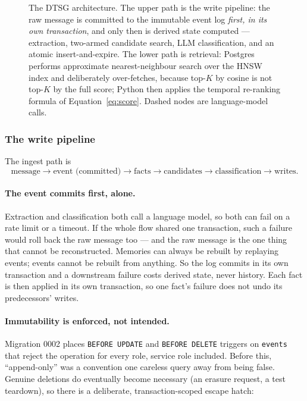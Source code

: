 \documentclass[11pt,a4paper]{article}
\begin{document}
\begin{figure}[htbp]
{}
\caption{The DTSG architecture. The upper path is the write pipeline: the raw
message is committed to the immutable event log \emph{first, in its own
transaction}, and only then is derived state computed --- extraction,
two-armed candidate search, LLM classification, and an atomic
insert-and-expire. The lower path is retrieval: Postgres performs approximate
nearest-neighbour search over the HNSW index and deliberately over-fetches,
because top-$K$ by cosine is not top-$K$ by the full score; Python then applies
the temporal re-ranking formula of Equation~\eqref{eq:score}. Dashed nodes are
language-model calls.}
\label{fig:arch}
\end{figure}

\subsubsection{The write pipeline}

The ingest path is
\[
\text{message} \rightarrow \text{event (committed)} \rightarrow \text{facts}
\rightarrow \text{candidates} \rightarrow \text{classification}
\rightarrow \text{writes}.
\]

\paragraph{The event commits first, alone.} Extraction and classification both
call a language model, so both can fail on a rate limit or a timeout. If the
whole flow shared one transaction, such a failure would roll back the raw
message too --- and the raw message is the one thing that cannot be
reconstructed. Memories can always be rebuilt by replaying events; events
cannot be rebuilt from anything. So the log commits in its own transaction and
a downstream failure costs derived state, never history. Each fact is then
applied in its own transaction, so one fact's failure does not undo its
predecessors' writes.

\paragraph{Immutability is enforced, not intended.} Migration 0002 places
\texttt{BEFORE UPDATE} and \texttt{BEFORE DELETE} triggers on \texttt{events}
that reject the operation for every role, service role included. Before this,
``append-only'' was a convention one careless query away from being false.
Genuine deletions do eventually become necessary (an erasure request, a test
teardown), so there is a deliberate, transaction-scoped escape hatch:
\end{document}
